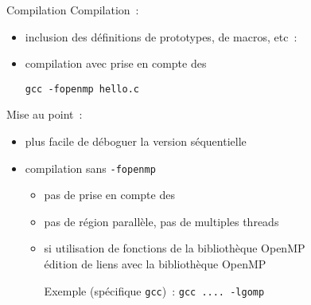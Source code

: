 \begin {frame} {Compilation}
    Compilation~:

    \begin {itemize}
	\item inclusion des définitions de prototypes, de macros, etc~:

	    \hspace* {5mm} 

	\item compilation avec prise en compte des 
	
	    \hspace* {5mm} \texttt {gcc -fopenmp hello.c}
    \end {itemize}

    Mise au point~:
    \begin {itemize}
	\item plus facile de déboguer la version séquentielle
	\item compilation sans \texttt {-fopenmp}
	    \begin {itemize}
		\item pas de prise en compte des 
		\item pas de région parallèle, pas de multiples threads
		\item si utilisation de fonctions de la bibliothèque OpenMP \\
		    \implique édition de liens avec la bibliothèque OpenMP

		    Exemple (spécifique \texttt {gcc})~:
			\texttt {gcc .... -lgomp}

	    \end {itemize}
    \end {itemize}
\end {frame}




